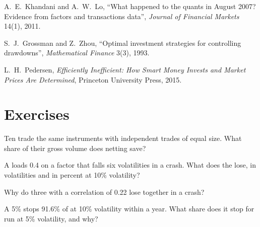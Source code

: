 \begin{omsources}
\item A.~E.~Khandani and A.~W.~Lo, ``What happened to the quants in August 2007? Evidence from factors and transactions data'', \emph{Journal of
Financial Markets} 14(1), 2011.
\item S.~J.~Grossman and Z.~Zhou, ``Optimal investment strategies for controlling drawdowns'', \emph{Mathematical Finance} 3(3), 1993.
\item L.~H.~Pedersen, \emph{Efficiently Inefficient: How Smart Money Invests and Market Prices Are Determined}, Princeton University Press, 2015.
\end{omsources}

\section{Exercises}

\begin{exercise}[$\star$]\label{exo:s1:running-a-multi-strategy-book:1}
Ten  trade the same instruments with independent trades of equal size. What share of their gross volume does netting save?
\end{exercise}

\begin{exercise}[$\star$]\label{exo:s1:running-a-multi-strategy-book:2}
A  loads 0.4 on a factor that falls six  volatilities in a crash. What does the  lose, in volatilities and in percent at 10\% volatility?
\end{exercise}

\begin{exercise}[$\star$]\label{exo:s1:running-a-multi-strategy-book:3}
Why do three  with a correlation of 0.22 lose together in a crash?
\end{exercise}

\begin{exercise}[$\star\star$]\label{exo:s1:running-a-multi-strategy-book:4}
A 5\%  stops 91.6\% of  at 10\% volatility within a year. What share does it stop for  run at 5\% volatility, and why?
\end{exercise}

